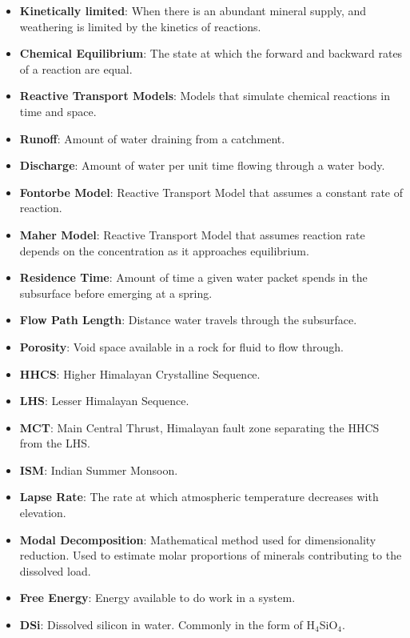 \documentclass[hidelinks, 12pt]{article} %
\begin{document}
{\normalsize


\begin{itemize}[wide]
  \setlength{\itemindent}{-0mm}  %

  \item[] \textbf{Kinetically limited}: When there is an abundant mineral supply, and weathering is limited by the kinetics of reactions.
  \item[] \textbf{Chemical Equilibrium}: The state at which the forward and backward rates of a reaction are equal.
  \item[] \textbf{Reactive Transport Models}: Models that simulate chemical reactions in time and space.
  \item[] \textbf{Runoff}: Amount of water draining from a catchment.
  \item[] \textbf{Discharge}: Amount of water per unit time flowing through a water body.
  \item[] \textbf{Fontorbe Model}: Reactive Transport Model that assumes a constant rate of reaction.
  \item[] \textbf{Maher Model}: Reactive Transport Model that assumes reaction rate depends on the concentration as it approaches equilibrium.
  \item[] \textbf{Residence Time}: Amount of time a given water packet spends in the subsurface before emerging at a spring.
  \item[] \textbf{Flow Path Length}: Distance water travels through the subsurface.
  \item[] \textbf{Porosity}: Void space available in a rock for fluid to flow through.
  \item[] \textbf{HHCS}: Higher Himalayan Crystalline Sequence.
  \item[] \textbf{LHS}: Lesser Himalayan Sequence.
  \item[] \textbf{MCT}: Main Central Thrust, Himalayan fault zone separating the HHCS from the LHS.
  \item[] \textbf{ISM}: Indian Summer Monsoon.
  \item[] \textbf{Lapse Rate}: The rate at which atmospheric temperature decreases with elevation.
  \item[] \textbf{Modal Decomposition}: Mathematical method used for dimensionality reduction. Used to estimate molar proportions of minerals contributing to the dissolved load.
  \item[] \textbf{Free Energy}: Energy available to do work in a system.
  \item[] \textbf{DSi}: Dissolved silicon in water. Commonly in the form of H$_4$SiO$_4$.



\end{itemize}

}
\end{document}
